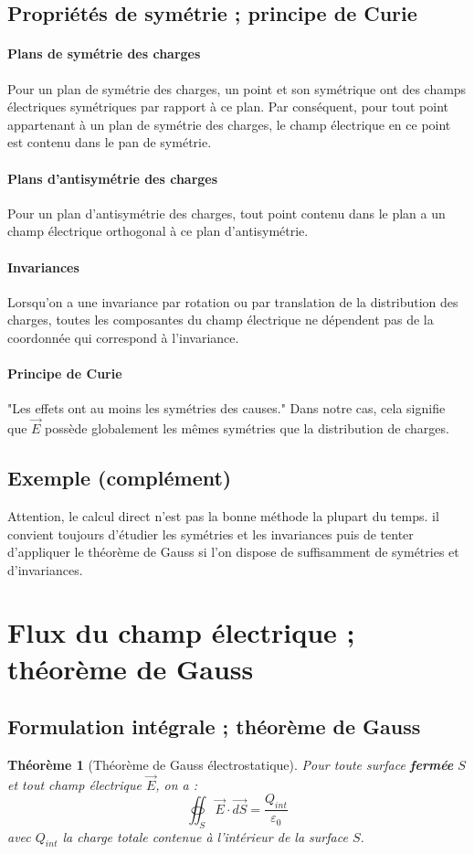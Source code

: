 \documentclass[french]{book}
\theoremstyle{plain}
\newtheorem{thm}{Théorème}
\theoremstyle{definition}
\theoremstyle{remark}
\begin{document}
\subsection{Propriétés de symétrie ; principe de Curie}
\paragraph{Plans de symétrie des charges}
Pour un plan de symétrie des charges, un point et son symétrique ont des champs électriques symétriques par rapport à ce plan. Par conséquent, pour tout point appartenant à un plan de symétrie des charges, le champ électrique en ce point est contenu dans le pan de symétrie.
\paragraph{Plans d'antisymétrie des charges}
Pour un plan d'antisymétrie des charges, tout point contenu dans le plan a un champ électrique orthogonal à ce plan d'antisymétrie.
\paragraph{Invariances}Lorsqu'on a une invariance par rotation ou par translation de la distribution des charges, toutes les composantes du champ électrique ne dépendent pas de la coordonnée qui correspond à l'invariance.
\paragraph{Principe de Curie} "Les effets ont au moins les symétries des causes." Dans notre cas, cela signifie que $\overrightarrow{E}$ possède globalement les mêmes symétries que la distribution de charges.
\subsection{Exemple (complément)}
Attention, le calcul direct n'est pas la bonne méthode la plupart du temps. il convient toujours d'étudier les symétries et les invariances puis de tenter d'appliquer le théorème de Gauss si l'on dispose de suffisamment de symétries et d'invariances.
\section{Flux du champ électrique ; théorème de Gauss}
\subsection{Formulation intégrale ; théorème de Gauss}
\begin{thm}[Théorème de Gauss électrostatique]
	Pour toute surface \textbf{fermée} $S$ et tout champ électrique $\overrightarrow{E}$, on a : $$\oiint_S \overrightarrow{E}\cdot\overrightarrow{dS}=\frac{Q_{int}}{\varepsilon_0}$$ avec $Q_{int}$ la charge totale contenue à l'intérieur de la surface $S$.
\end{thm}
\end{document}
